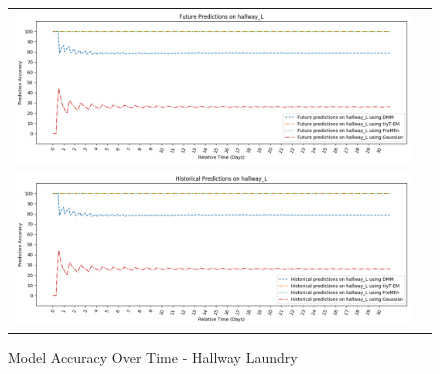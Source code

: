 \begin{figure}[!Hp]
  \begin{tabular}{cc}
    {\includegraphics[width = 6in]{images/results/Future_Predictions_on_hallway_L.png}} \\
    {\includegraphics[width = 6in]{images/results/Historical_Predictions_on_hallway_L.png}} \\
  \end{tabular}
  \caption{Model Accuracy Over Time - Hallway Laundry}
\end{figure}

